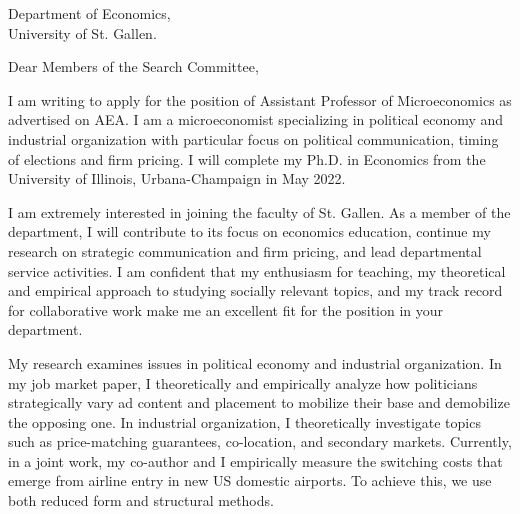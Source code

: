 \documentclass[12pt]{letter}
\begin{document}
\date{}
\begin{letter}{Department of Economics,\\
University of St. Gallen.}

\opening{Dear Members of the Search Committee,}

I am writing to apply for the position of Assistant Professor of Microeconomics as advertised on AEA.
I am a microeconomist specializing in political economy and industrial organization with particular focus on political communication, timing of elections and firm pricing.
I will complete my Ph.D. in Economics from the University of Illinois, Urbana-Champaign in May 2022. 

I am extremely interested in joining the faculty of St. Gallen.
As a member of the department, I will contribute to its focus on economics education,
continue my research on strategic communication and firm pricing, and lead departmental service activities.
%
I am confident that my enthusiasm for teaching, my theoretical and empirical approach to studying socially relevant topics, 
and my track record for collaborative work make me an excellent fit for the position in your department. 


My research examines issues in political economy and industrial organization.
In my job market paper, I theoretically and empirically analyze how politicians strategically vary ad content and placement to mobilize their base and demobilize the opposing one.
In industrial organization, I theoretically investigate topics such as price-matching guarantees, co-location, and secondary markets.
Currently, in a joint work, my co-author and I empirically measure the switching costs that emerge from airline entry in new US domestic airports.
To achieve this, we use both reduced form and structural methods.


\end{letter}
\end{document}
